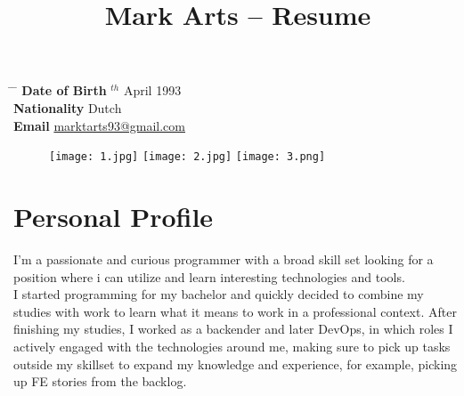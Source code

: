 \documentclass[10pt]{article} %
\begin{document}

\title{Mark Arts -- Resume} %


\parbox{0.5\textwidth}{ %
\begin{tabbing} %
\hspace{3cm} \= \hspace{4cm} \= \kill %
{\bf Date of Birth} $^{th}$ April 1993 \\ %
{\bf Nationality} \> Dutch \\%
{\bf Email} \> \href{mailto:marktarts93@gmail.com}{marktarts93@gmail.com} \\ %
\end{tabbing}}


\begin{figure}[ht]
  \texttt{[image: 1.jpg]}
  \texttt{[image: 2.jpg]}
  \texttt{[image: 3.png]}
\end{figure}

\section{Personal Profile}

I'm a passionate and curious programmer with a broad skill set looking for a position where i can utilize and learn interesting technologies and tools. \\

I started programming for my bachelor and quickly decided to combine my studies with work to learn what it means to work in a professional context. After finishing my studies, I worked as a backender and later DevOps, in which roles I actively engaged with the technologies around me, making sure to pick up tasks outside my skillset to expand my knowledge and experience, for example, picking up FE stories from the backlog. \\
\end{document}
